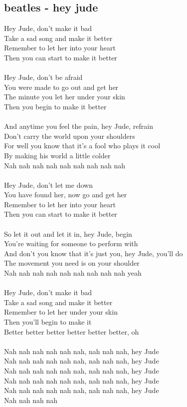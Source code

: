 \documentclass[a4paper,12pt]{book} %
\begin{document}
\begin{multicols}{2}
{\chapter{beatles - hey jude}
\noindent
Hey Jude, don't make it bad\\Take a sad song and make it better\\Remember to let her into your heart\\Then you can start to make it better\\\\Hey Jude, don't be afraid\\You were made to go out and get her\\The minute you let her under your skin\\Then you begin to make it better\\\\And anytime you feel the pain, hey Jude, refrain\\Don't carry the world upon your shoulders\\For well you know that it's a fool who plays it cool\\By making his world a little colder\\Nah nah nah nah nah nah nah nah nah\\\\Hey Jude, don't let me down\\You have found her, now go and get her\\Remember to let her into your heart\\Then you can start to make it better\\\\So let it out and let it in, hey Jude, begin\\You're waiting for someone to perform with\\And don't you know that it's just you, hey Jude, you'll do\\The movement you need is on your shoulder\\Nah nah nah nah nah nah nah nah nah yeah\\\\Hey Jude, don't make it bad\\Take a sad song and make it better\\Remember to let her under your skin\\Then you'll begin to make it\\Better better better better better better, oh\\\\Nah nah nah nah nah nah, nah nah nah, hey Jude\\Nah nah nah nah nah nah, nah nah nah, hey Jude\\Nah nah nah nah nah nah, nah nah nah, hey Jude\\Nah nah nah nah nah nah, nah nah nah, hey Jude\\Nah nah nah nah nah nah, nah nah nah, hey Jude\\Nah nah nah nah }
\end{multicols}
\end{document}
